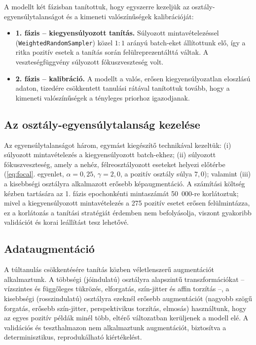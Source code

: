 A modellt két fázisban tanítottuk, hogy egyszerre kezeljük az
osztály-egyensúlytalanságot és a kimeneti valószínűségek kalibrációját:

\begin{itemize}
  \item \textbf{1. fázis -- kiegyensúlyozott tanítás.} Súlyozott
  mintavételezéssel (\texttt{WeightedRandomSampler}) közel $1{:}1$ arányú
  batch-eket állítottunk elő, így a ritka pozitív esetek a tanítás során
  felülreprezentálttá váltak. A veszteségfüggvény súlyozott fókuszveszteség
  \cite{lin2017focal} volt.
  \item \textbf{2. fázis -- kalibráció.} A modellt a valós, erősen
  kiegyensúlyozatlan eloszlású adaton, tizedére csökkentett tanulási rátával
  tanítottuk tovább, hogy a kimeneti valószínűségek a tényleges priorhoz
  igazodjanak.
\end{itemize}

\subsection{Az osztály-egyensúlytalanság kezelése}

Az egyensúlytalanságot három, egymást kiegészítő technikával kezeltük: (i)
súlyozott mintavételezés a kiegyensúlyozott batch-ekhez; (ii) súlyozott
fókuszveszteség, amely a nehéz, félreosztályozott eseteket helyezi előtérbe
(\ref{eq:focal}. egyenlet, $\alpha = 0{,}25$, $\gamma = 2{,}0$, a pozitív
osztály súlya $7{,}0$); valamint (iii) a kisebbségi osztályra alkalmazott
erősebb képaugmentáció. A számítási költség kézben tartására az 1. fázis
epochonkénti mintaszámát 50~000-re korlátoztuk; mivel a kiegyensúlyozott
mintavételezés a 275 pozitív esetet erősen felülmintázza, ez a korlátozás a
tanítási stratégiát érdemben nem befolyásolja, viszont gyakoribb validációt és
korai leállítást tesz lehetővé.

\subsection{Adataugmentáció}

A túltanulás csökkentésére tanítás közben véletlenszerű augmentációt
alkalmaztunk. A többségi (jóindulatú) osztályra alapszintű transzformációkat --
vízszintes és függőleges tükrözés, elforgatás, szín-jitter és affin torzítás --,
a kisebbségi (rosszindulatú) osztályra ezeknél erősebb augmentációt (nagyobb
szögű forgatás, erősebb szín-jitter, perspektivikus torzítás, elmosás)
használtunk, hogy az egyes pozitív példák minél több, eltérő változatban
kerüljenek a modell elé. A validációs és teszthalmazon nem alkalmaztunk
augmentációt, biztosítva a determinisztikus, reprodukálható kiértékelést.

